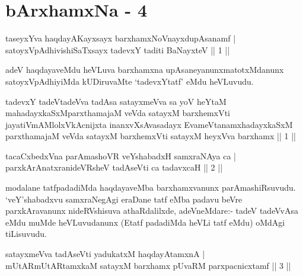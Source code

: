 
\chapter{bArxhamxNa - 4}
\begin{shl}
taseyxYva haqdayAKayxsayx barxhamxNoV\s nayxdupAsanamf | \\
satoyxVpAdhivishiSaTxsayx tadevxY taditi BaNayxteV \hfill ||  1 || 
\end{shl}

\begin{artha}
adeV haqdayaveMdu heVLuva barxhamxna upAsaneyanunx\break matotxMdanunx satoyxVpAdhiyiMda kUDiruvaMte `tadevxYtatf' eMdu heVLuvudu.
\end{artha}


\begin{kandikeshl}
tadevxY tadeVtadeVva tadAsa satayxmeVva sa yoV heYtaM mahadayxkaSxM\break parxthamajaM veVda satayxM barxhemxVti jayatiVmAMlolxVkAcnijxta inanxvXsAvasadayx EvameVtanamxhadayxkaSxM parxthamajaM veVda satayxM barxhemxVti satayxM heyxVva barxhamx || 1 ||
\end{kandikeshl}

\begin{shl}
tacaCxbedxVna parAmashoVR veYshabadxH samxraNAya ca | \\
parxkArAnatxranideVRsheV tadAseVti ca tadavxcaH \hfill ||  2 || 
\end{shl}

\begin{artha}
modalane tatfpadadiMda haqdayaveMba barxhamxvanunx parAmashiRsuvudu. `veY'shabadxvu samxraNegAgi eraDane tatf eMba padavu beVre parxkAravanunx nideRVshisuva athaRdalilxde, adeVneMdare:- tadeV tadeVvA\s sa eMdu muMde heVLuvudanunx (Etatf padadiMda heVLi tatf eMdu) oMdAgi tiLisuvudu.
\end{artha}


\begin{shl}
satayxmeVva tadAseVti yadukatxM haqdayAtamxnA | \\
mUtARmUtARtamxkaM satayxM barxhamx pUvaRM parxpacnicxtamf \hfill ||  3 || 
\end{shl}

